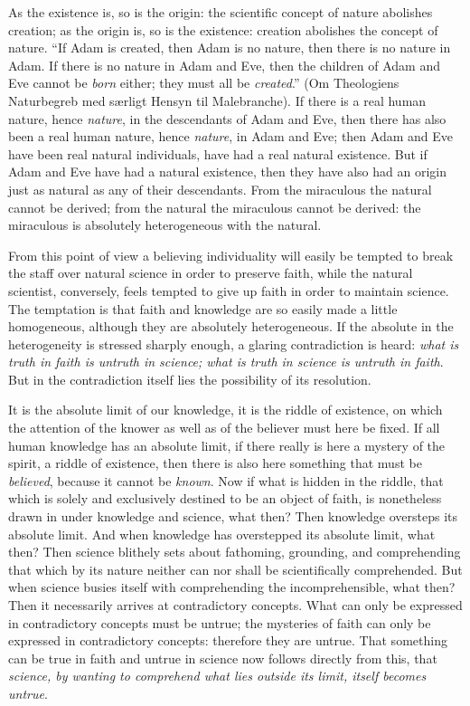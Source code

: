 \documentclass[12pt]{book}
\newcommand{\opage}[1]{\marginnote{\footnotesize\textit{[#1]}}}
\begin{document}
As the existence is, so is the origin: the scientific concept of nature abolishes creation; as the origin is, so is the existence: creation abolishes the concept of nature. ``If Adam is created, then Adam is no nature, then there is no nature in Adam. If there is no nature in Adam and Eve, then the children of Adam and Eve cannot be \emph{born} either; they must all be \emph{created}.'' (Om Theologiens Naturbegreb med særligt Hensyn til Malebranche). If there is a real human nature, hence \emph{nature}, in the descendants of Adam and Eve, then there has also been a real human nature, hence \emph{nature}, in Adam and Eve; then Adam and Eve have been real natural individuals, have had a real natural existence. But if Adam and Eve have had a natural existence, then they have also had an origin just as natural as any of their descendants. From the miraculous the natural cannot be derived; from the natural the miraculous cannot be derived: the miraculous is absolutely heterogeneous with the natural.

From this point of view a believing individuality will easily be tempted to break the staff over natural science in order to preserve faith, while the natural scientist, conversely, feels tempted to give up faith in order to maintain science. The temptation is that faith and knowledge are so easily made a little homogeneous, although they are absolutely heterogeneous. If the absolute in the heterogeneity is stressed sharply enough, a glaring contradiction is heard: \emph{what is truth in faith is untruth in science; what is truth in science is untruth in faith}. But in the contradiction itself lies the possibility of its resolution.

It is the absolute limit of our knowledge, it is the riddle of
\opage{32}\setcounter{footnote}{0}%
existence, on which the attention of the knower as well as of the believer must here be fixed. If all human knowledge has an absolute limit, if there really is here a mystery of the spirit, a riddle of existence, then there is also here something that must be \emph{believed}, because it cannot be \emph{known}. Now if what is hidden in the riddle, that which is solely and exclusively destined to be an object of faith, is nonetheless drawn in under knowledge and science, what then? Then knowledge oversteps its absolute limit. And when knowledge has overstepped its absolute limit, what then? Then science blithely sets about fathoming, grounding, and comprehending that which by its nature neither can nor shall be scientifically comprehended. But when science busies itself with comprehending the incomprehensible, what then? Then it necessarily arrives at contradictory concepts. What can only be expressed in contradictory concepts must be untrue; the mysteries of faith can only be expressed in contradictory concepts: therefore they are untrue. That something can be true in faith and untrue in science now follows directly from this, that \emph{science, by wanting to comprehend what lies outside its limit, itself becomes untrue}.
\end{document}
